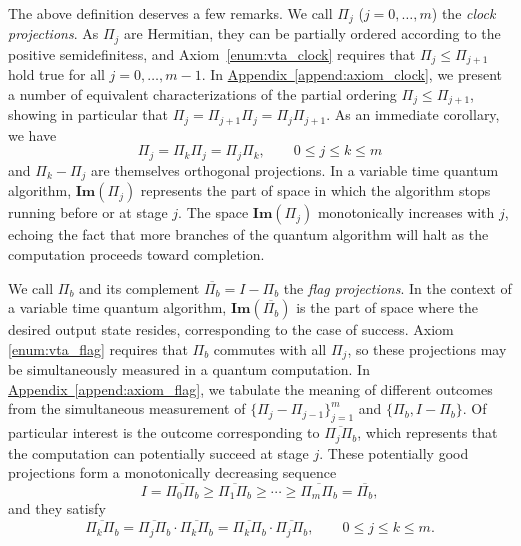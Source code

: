 \documentclass[letterpaper,onecolumn,11pt,accepted=2026-02-14]{quantumarticle}
\theoremstyle{remark}
\theoremstyle{plain}
\newcommand{\append}[1]{\hyperref[append:#1]{Appendix~\ref*{append:#1}}}
\begin{document}
The above definition deserves a few remarks. We call $\Pi_j$ ($j=0,\ldots,m$) the \emph{clock projections}. As $\Pi_j$ are Hermitian, they can be partially ordered according to the positive semidefinitess, and Axiom~\ref{enum:vta_clock} requires that $\Pi_j\leq\Pi_{j+1}$ hold true for all $j=0,\ldots,m-1$. In \append{axiom_clock}, we present a number of equivalent characterizations of the partial ordering $\Pi_j\leq\Pi_{j+1}$, showing in particular that $\Pi_{j}=\Pi_{j+1}\Pi_j=\Pi_{j}\Pi_{j+1}$.
As an immediate corollary, we have
\begin{equation}
    \Pi_j=\Pi_k\Pi_j=\Pi_j\Pi_k,\qquad 0\leq j\leq k\leq m
\end{equation}
and $\Pi_k-\Pi_j$ are themselves orthogonal projections. In a variable time quantum algorithm, $\mathbf{Im}(\Pi_j)$ represents the part of space in which the algorithm stops running before or at stage $j$. The space $\mathbf{Im}(\Pi_j)$ monotonically increases with $j$, echoing the fact that more branches of the quantum algorithm will halt as the computation proceeds toward completion.

We call $\Pi_b$ and its complement $\overline{\Pi_b}=I-\Pi_b$ the \emph{flag projections}. In the context of a variable time quantum algorithm, $\mathbf{Im}(\overline{\Pi_b})$ is the part of space where the desired output state resides, corresponding to the case of success. Axiom \ref{enum:vta_flag} requires that $\Pi_b$ commutes with all $\Pi_j$, so these projections may be simultaneously measured in a quantum computation. In \append{axiom_flag}, we tabulate the meaning of different outcomes from the simultaneous measurement of $\{\Pi_j-\Pi_{j-1}\}_{j=1}^m$ and $\{\Pi_b,I-\Pi_b\}$. Of particular interest is the outcome corresponding to $\overline{\Pi_j\Pi_b}$, which represents that the computation can potentially succeed at stage $j$. These potentially good projections form a monotonically decreasing sequence
\begin{equation}
    I=\overline{\Pi_0\Pi_b}\geq\overline{\Pi_1\Pi_b}\geq\cdots\geq\overline{\Pi_m\Pi_b}=\overline{\Pi_b},
\end{equation}
and they satisfy
\begin{equation}
    \overline{\Pi_k\Pi_b}=\overline{\Pi_j\Pi_b}\cdot\overline{\Pi_k\Pi_b}=\overline{\Pi_k\Pi_b}\cdot\overline{\Pi_j\Pi_b},\qquad
    0\leq j\leq k\leq m.
\end{equation}
\end{document}
